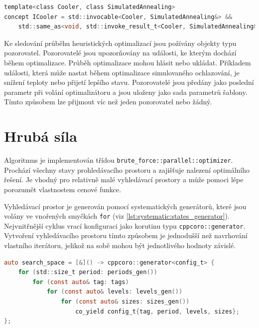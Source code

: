 \begin{lstlisting}[caption={~Koncept pro kontrolu chladícího algoritmu},label={lst:cooling:concept},captionpos=t,abovecaptionskip=-\medskipamount,belowcaptionskip=\medskipamount,language=C]
template<class Cooler, class SimulatedAnnealing>
concept ICooler = std::invocable<Cooler, SimulatedAnnealing&> &&
    std::same_as<void, std::invoke_result_t<Cooler, SimulatedAnnealing&>>;
\end{lstlisting}


Ke sledování průběhu heuristických optimalizací jsou požívány objekty typu pozorovatel.
Pozorovatelé jsou upozorňovány na události, ke kterým dochází během optimalizace.
Průběh optimalizace mohou hlásit nebo ukládat.
Příkladem události, která může nastat během optimalizace simulovaného ochlazování, je snížení teploty nebo přijetí lepšího stavu.
Pozorovatelé jsou předány jako poslední parametr při volání optimalizátoru a jsou uloženy jako sada parametrů šablony.
Tímto způsobem lze přijmout víc než jeden pozorovatel nebo žádný.


\section{Hrubá síla}
Algoritmus je implementován třídou \texttt{brute\_force::parallel::optimizer}.
Prochází všechny stavy prohledávacího prostoru a zajišťuje nalezení optimálního řešení.
Je vhodný pro relativně malé vyhledávací prostory a může pomoci lépe porozumět vlastnostem cenové funkce.

Vyhledávací prostor je generován pomocí systematických generátorů, které jsou volány ve vnořených smyčkách \texttt{for} (viz \ref{lst:systematic:states_generator}).
Nejvnitřnější cyklus vrací konfiguraci jako korutinu typu \texttt{cppcoro::generator}.
Vytvoření vyhledávacího prostoru tímto způsobem je jednodušší než navrhování vlastního iterátoru, jelikož na sobě mohou být jednotlivého hodnoty závislé.

\begin{lstlisting}[caption={~Ukázka generování systematického stavového prostoru},label={lst:systematic:states_generator},captionpos=t,abovecaptionskip=-\medskipamount,belowcaptionskip=\medskipamount,language=C]
auto search_space = [&]() -> cppcoro::generator<config_t> {
    for (std::size_t period: periods_gen())
        for (const auto& tag: tags)
            for (const auto& levels: levels_gen())
                for (const auto& sizes: sizes_gen())
                    co_yield config_t{tag, period, levels, sizes};
};
\end{lstlisting}

